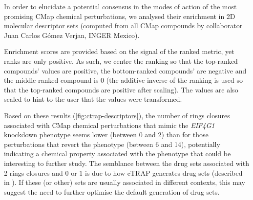 In order to elucidate a potential consensus in the modes of action of the most promising CMap chemical perturbations, we analysed their enrichment in 2D molecular descriptor sets (computed from all CMap compounds by collaborator Juan Carlos Gómez Verjan, INGER Mexico).

Enrichment scores are provided based on the signal of the ranked metric, yet ranks are only positive. As such, we centre the ranking so that the top-ranked compounds' values are positive, the bottom-ranked compounds' are negative and the middle-ranked compound is 0 (the additive inverse of the ranking is used so that the top-ranked compounds are positive after scaling). The values are also scaled to hint to the user that the values were transformed.

Based on these results (\autoref{fig:ctrap-descriptors}), the number of rings closures associated with CMap chemical perturbations that mimic the \emph{EIF4G1} knockdown phenotype seems lower (between 0 and 2) than for those perturbations that revert the phenotype (between 6 and 14), potentially indicating a chemical property associated with the phenotype that could be interesting to further study.
The semblance between the drug sets associated with 2 rings closures and 0 or 1 is due to how cTRAP generates drug sets (described in ). If these (or other) sets are usually associated in different contexts, this may suggest the need to further optimise the default generation of drug sets.

